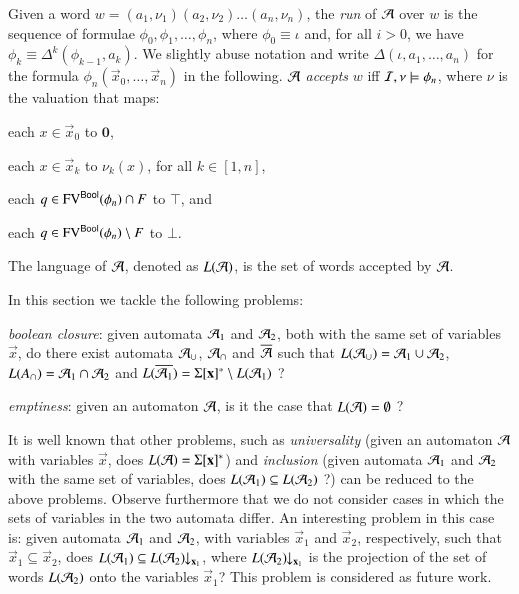 \documentclass{llncs}
\begin{document}
Given a word $w = (a_1,\nu_1)(a_2,\nu_2) \ldots (a_n,\nu_n)$, the
\emph{run} of $\mathcal{A}$ over $w$ is the sequence of formulae
$\phi_0,\phi_1,\ldots,\phi_n$, where $\phi_0 \equiv \iota$ and, for
all $i > 0$, we have $\phi_k \equiv \Delta^k(\phi_{k-1},a_k)$. We
slightly abuse notation and write $\Delta(\iota,a_1,\ldots,a_n)$ for
the formula $\phi_n(\vec{x}_0,\ldots,\vec{x}_n)$ in the
following. $\mathcal{A}$ \emph{accepts} $w$ iff $\mathcal{I},\nu \models \phi_n$, where
$\nu$ is the valuation that maps:\begin{inparaenum}[(1)]
\item each $x \in \vec{x}_0$ to $\mathbf{0}$, 
%
\item each $x \in \vec{x}_k$ to $\nu_k(x)$, for all $k\in[1,n]$, 
%
\item each $q \in \mathrm{FV}^{\mathsf{Bool}}(\phi_n) \cap F$ to $\top$, and 
%
\item each $q \in \mathrm{FV}^{\mathsf{Bool}}(\phi_n) \setminus F$ to $\bot$.
\end{inparaenum}
The language of $\mathcal{A}$, denoted as $L(\mathcal{A})$, is the set of words accepted
by $\mathcal{A}$. 

In this section we tackle the following problems: \begin{compactenum}
\item \emph{boolean closure}: given automata $\mathcal{A}_1$ and $\mathcal{A}_2$, both
  with the same set of variables $\vec{x}$, do there exist automata
  $\mathcal{A}_\cup$, $\mathcal{A}_\cap$ and $\overline{\mathcal{A}}$ such that $L(\mathcal{A}_\cup) =
  \mathcal{A}_1 \cup \mathcal{A}_2$, $L(A_\cap) = \mathcal{A}_1 \cap \mathcal{A}_2$ and
  $L(\overline{\mathcal{A}_1}) = \Sigma[\mathbf x]^* \setminus L(\mathcal{A}_1)$ ?
%
\item \emph{emptiness}: given an automaton $\mathcal{A}$, is it the case that
  $L(\mathcal{A}) = \emptyset$ ?
\end{compactenum}

It is well known that other problems, such as \emph{universality}
(given an automaton $\mathcal{A}$ with variables $\vec{x}$, does $L(\mathcal{A}) =
\Sigma[\mathbf x]^*$) and \emph{inclusion} (given automata $\mathcal{A}_1$ and
$\mathcal{A}_2$ with the same set of variables, does $L(\mathcal{A}_1) \subseteq
L(\mathcal{A}_2)$ ?) can be reduced to the above problems. Observe furthermore
that we do not consider cases in which the sets of variables in the
two automata differ. An interesting problem in this case is: given
automata $\mathcal{A}_1$ and $\mathcal{A}_2$, with variables $\vec{x}_1$ and
$\vec{x}_2$, respectively, such that $\vec{x}_1 \subseteq \vec{x}_2$,
does $L(\mathcal{A}_1) \subseteq {L(\mathcal{A}_2)}\!\!\downarrow_{{\mathbf x_1}}$, where
${L(\mathcal{A}_2)}\!\!\downarrow_{{\mathbf x_1}}$ is the projection of the set of words
$L(\mathcal{A}_2)$ onto the variables $\vec{x}_1$? This problem is considered
as future work.
\end{document}
